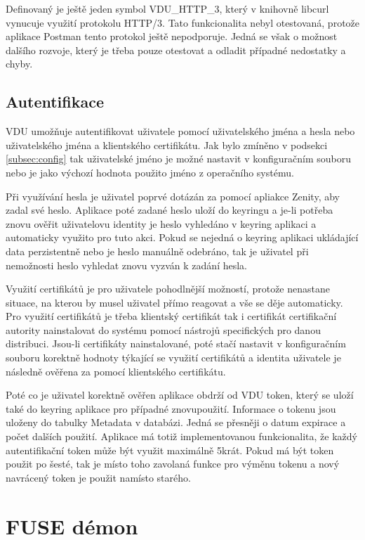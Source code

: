 Definovaný je ještě jeden symbol VDU\_HTTP\_3, který v knihovně libcurl vynucuje využití protokolu HTTP/3. Tato funkcionalita nebyl otestovaná, protože aplikace Postman 
tento protokol ještě nepodporuje. Jedná se však o možnost dalšího rozvoje, který je třeba pouze otestovat a odladit případné nedostatky a chyby.

\subsection{Autentifikace}
\label{subsec:authentication}

VDU umožňuje autentifikovat uživatele pomocí uživatelského jména a hesla nebo uživatelského jména a klientského certifikátu. Jak bylo zmíněno v podsekci \ref{subsec:config}
tak uživatelské jméno je možné nastavit v konfiguračním souboru nebo je jako výchozí hodnota použito jméno z operačního systému.

Při využívání hesla je uživatel poprvé dotázán za pomocí apliakce Zenity, aby zadal své heslo. Aplikace poté zadané heslo uloží do keyringu a je-li potřeba znovu ověřit
uživatelovu identity je heslo vyhledáno v keyring aplikaci a automaticky využito pro tuto akci. Pokud se nejedná o keyring aplikaci ukládající data perzistentně nebo je
heslo manuálně odebráno, tak je uživatel při nemožnosti heslo vyhledat znovu vyzván k zadání hesla.

Využití certifikátů je pro uživatele pohodlnější možností, protože nenastane situace, na kterou by musel uživatel přímo reagovat a vše se děje automaticky. Pro využití
certifikátů je třeba klientský certifikát tak i certifikát certifikační autority nainstalovat do systému pomocí nástrojů specifických pro danou distribuci. Jsou-li certifikáty
nainstalované, poté stačí nastavit v konfiguračním souboru korektně hodnoty týkající se využití certifikátů a identita uživatele je následně ověřena za pomocí klientského
certifikátu.

Poté co je uživatel korektně ověřen aplikace obdrží od VDU token, který se uloží také do keyring aplikace pro případné znovupoužití. Informace o tokenu jsou uloženy do 
tabulky Metadata v databázi. Jedná se přesněji o datum expirace a počet dalších použití. Aplikace má totiž implementovanou funkcionalita, že každý autentifikační token
může být využit maximálně 5krát. Pokud má být token použit po šesté, tak je místo toho zavolaná funkce pro výměnu tokenu a nový navrácený token je použit namísto starého.

\section{FUSE démon}

